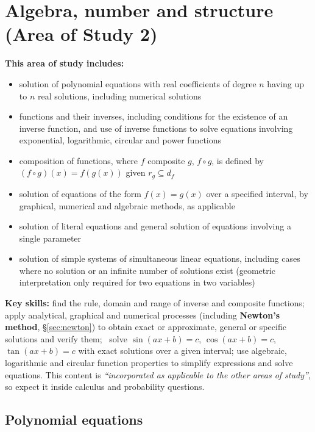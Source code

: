 \section{Algebra, number and structure (Area of Study 2)}
\label{sec:algebra}

\begin{sdbox}
\textbf{This area of study includes:}
\begin{itemize}
  \item solution of polynomial equations with real coefficients of degree $n$ having up to $n$ real solutions, including numerical solutions
  \item functions and their inverses, including conditions for the existence of an inverse function, and use of inverse functions to solve equations involving exponential, logarithmic, circular and power functions
  \item composition of functions, where $f$ composite $g$, $f\circ g$, is defined by $(f\circ g)(x)=f(g(x))$ given $r_g\subseteq d_f$
  \item solution of equations of the form $f(x)=g(x)$ over a specified interval, by graphical, numerical and algebraic methods, as applicable
  \item solution of literal equations and general solution of equations involving a single parameter
  \item solution of simple systems of simultaneous linear equations, including cases where no solution or an infinite number of solutions exist (geometric interpretation only required for two equations in two variables)
\end{itemize}
\textbf{Key skills:} find the rule, domain and range of inverse and composite functions; apply analytical, graphical and numerical processes (including \textbf{Newton's method}, \S\ref{sec:newton}) to obtain exact or approximate, general or specific solutions and verify them; \byhand\ solve $\sin(ax+b)=c$, $\cos(ax+b)=c$, $\tan(ax+b)=c$ with exact solutions over a given interval; use algebraic, logarithmic and circular function properties to simplify expressions and solve equations. This content is \emph{``incorporated as applicable to the other areas of study''}, so expect it inside calculus and probability questions.
\end{sdbox}

\subsection{Polynomial equations}
\label{sec:polyeq}

